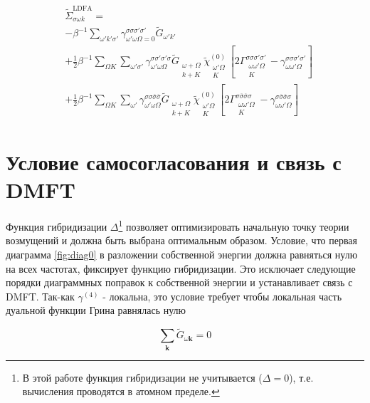 \documentclass[11pt,a4paper]{report}
\begin{document}
\begin{equation}
\begin{split}
 &\tilde{\Sigma}^{\text{LDFA}}_{\sigma\omega k} = \\
 &-\beta^{-1}\sum_{\omega'k'\sigma'}\gamma^{\sigma\sigma\sigma'\sigma'}_{\omega'\omega\Omega=0}\tilde{G}_{\omega'k'} \\
 &+\frac{1}{2}\beta^{-1}\sum_{\Omega K}\sum_{\omega'\sigma'}\gamma^{\sigma\sigma'\sigma'\sigma}_{\omega'\omega\Omega}\tilde{G}_{\substack{\omega+\Omega\\k+K}}\tilde{\chi}^{(0)}_{\substack{\omega'\Omega\\K}}\left[2\Gamma^{\sigma\sigma\sigma'\sigma'}_{\substack{\omega\omega'\Omega\\K}}-\gamma^{\sigma\sigma\sigma'\sigma'}_{\omega\omega'\Omega}\right] \\
 &+\frac{1}{2}\beta^{-1}\sum_{\Omega K}\sum_{\omega'}\gamma^{\sigma\sigma\overline{\sigma}\overline{\sigma}}_{\omega'\omega\Omega}\tilde{G}_{\substack{\omega+\Omega\\k+K}}\tilde{\chi}^{(0)}_{\substack{\omega'\Omega\\K}}\left[2\Gamma^{\sigma\overline{\sigma}\overline{\sigma}\sigma}_{\substack{\omega\omega'\Omega\\K}}-\gamma^{\sigma\overline{\sigma}\overline{\sigma}\sigma}_{\omega\omega'\Omega}\right]
\end{split}
\end{equation}

\section{Условие самосогласования и связь с DMFT}

Функция гибридизации $\Delta$\footnote{В этой работе функция гибридизации не учитывается ($\Delta = 0$), т.е. вычисления проводятся в атомном пределе.}
позволяет оптимизировать начальную точку теории возмущений и должна быть выбрана оптимальным образом. Условие, что первая диаграмма \ref{fig:diag0} в разложении собственной энергии должна
равняться нулю на всех частотах, фиксирует функцию гибридизации. Это исключает следующие порядки диаграммных поправок к собственной энергии и устанавливает связь с DMFT. Так-как $\gamma^{(4)}$ - 
локальна, это условие требует чтобы локальная часть дуальной функции Грина равнялась нулю

\begin{equation}
\label{self-cons}
 \sum_\mathbf{k} \tilde{G}_{\omega\mathbf{k}} = 0
\end{equation}
\end{document}
